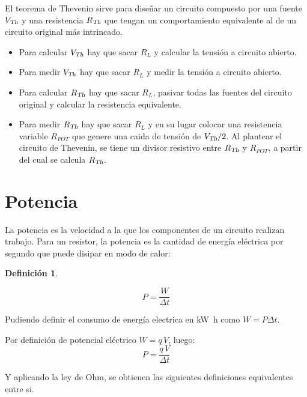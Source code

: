 \documentclass[a5paper,12pt,twoside]{book}
\newtheorem{defn}{{Definición}}[chapter]
\begin{document}
El teorema de Thevenin sirve para diseñar un circuito compuesto por una fuente ${{V}_\textsl{{Th}}}$ y una resistencia ${{R}_\textsl{{Th}}}$ que tengan un comportamiento equivalente al de un circuito original más intrincado.

\begin{itemize}
\item Para calcular ${{V}_\textsl{{Th}}}$ hay que sacar $R_L$ y calcular la tensión a circuito abierto.
\item Para medir ${{V}_\textsl{{Th}}}$ hay que sacar $R_L$ y medir la tensión a circuito abierto.
\item Para calcular ${{R}_\textsl{{Th}}}$ hay que sacar $R_L$, pasivar todas las fuentes del circuito original y calcular la resistencia equivalente.
\item Para medir ${{R}_\textsl{{Th}}}$ hay que sacar $R_L$ y en su lugar colocar una resistencia variable $R_{POT}$ que genere una caida de tensión de ${{V}_\textsl{{Th}}}/2$. Al plantear el circuito de Thevenin, se tiene un divisor resistivo entre ${{R}_\textsl{{Th}}}$ y $R_{POT}$, a partir del cual se calcula ${{R}_\textsl{{Th}}}$.
\end{itemize}


\section{Potencia}

La potencia es la velocidad a la que los componentes de un circuito realizan trabajo. Para un resistor, la potencia es la cantidad de energía eléctrica por segundo que puede disipar en modo de calor:

\begin{mdframed}[style=MyFrame1]
    \begin{defn}
    \end{defn}
    \begin{equation*}
        P = \frac{W}{\Delta t}
    \end{equation*}
\end{mdframed}

Pudiendo definir el consumo de energía electrica en \si{\kilo\watt\hour} como $W = P \Delta t$.

Por definición de potencial eléctrico $W = q \, V$, luego:
\begin{equation*}
    P = \frac{q \, V}{\Delta t}
\end{equation*}

Y aplicando la ley de Ohm, se obtienen las siguientes definiciones equivalentes entre si.
\end{document}
